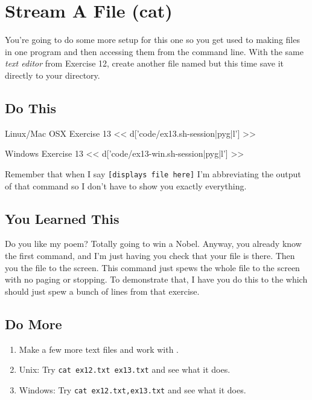\chapter{Stream A File (cat)}

You're going to do some more setup for this one so you get used to making files
in one program and then accessing them from the command line.  With the same \emph{text editor} from
Exercise 12, create another file named  but this time save
it directly to your  directory.

\section{Do This}

\begin{code}{Linux/Mac OSX Exercise 13}
<< d['code/ex13.sh-session|pyg|l'] >>
\end{code}

\begin{code}{Windows Exercise 13}
<< d['code/ex13-win.sh-session|pyg|l'] >>
\end{code}

Remember that when I say \verb|[displays file here]| I'm abbreviating the output of that command so I don't
have to show you exactly everything.

\section{You Learned This}

Do you like my poem? Totally going to win a Nobel.  Anyway, you already know the first command, and I'm just having you check that your file is there.  Then you  the file to the screen.  This command just spews the whole file to the 
screen with no paging or stopping.  To demonstrate that, I have you do this to the
 which should just spew a bunch of lines from that exercise.

\section{Do More}

\begin{enumerate}
\item Make a few more text files and work with .
\item Unix: Try \verb|cat ex12.txt ex13.txt| and see what it does.
\item Windows: Try \verb|cat ex12.txt,ex13.txt| and see what it does.
\end{enumerate}

